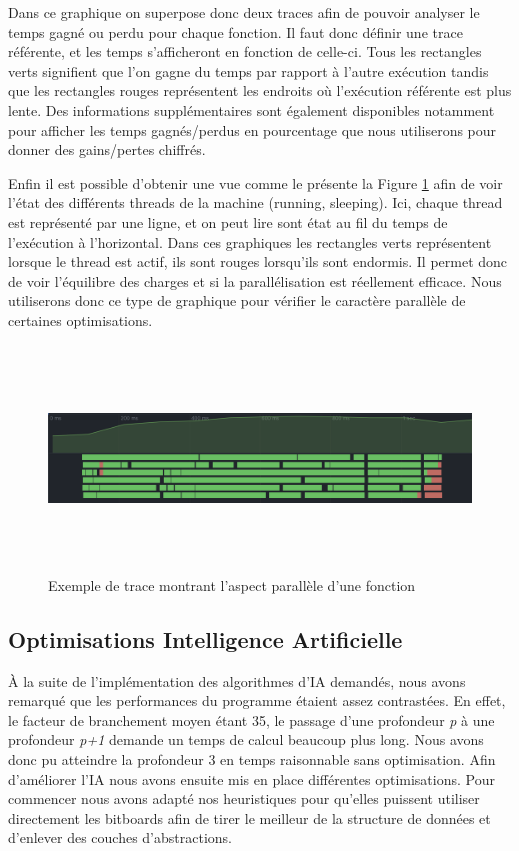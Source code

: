\documentclass{article}
\begin{document}
Dans ce graphique on superpose donc deux traces afin de pouvoir analyser le temps gagné ou perdu pour chaque fonction. Il faut donc définir une trace référente, et les temps
s'afficheront en fonction de celle-ci. Tous les rectangles verts signifient que l'on gagne du temps par rapport à l'autre exécution tandis que les rectangles rouges représentent
les endroits où l'exécution référente est plus lente. Des informations supplémentaires sont également disponibles notamment pour afficher les temps gagnés/perdus en pourcentage
que nous utiliserons pour donner des gains/pertes chiffrés.

Enfin il est possible d'obtenir une vue comme le présente la Figure \ref{thread_ex} afin de voir l'état des différents threads de la machine (running, sleeping). Ici, chaque thread est représenté
par une ligne, et on peut lire sont état au fil du temps de l'exécution à l'horizontal. Dans ces graphiques les rectangles verts
représentent lorsque le thread est actif, ils sont rouges lorsqu'ils sont endormis. Il permet donc de voir l'équilibre des charges et si la parallélisation est réellement efficace.
Nous utiliserons donc ce type de graphique pour vérifier le caractère parallèle de certaines optimisations.

\begin{figure}[h]
    \centering
    \includegraphics[width=\textwidth,height=6.0cm,keepaspectratio]{threads_ex.png}
    \caption{Exemple de trace montrant l'aspect parallèle d'une fonction}
    \label{thread_ex}
\end{figure}
\FloatBarrier

\subsection{Optimisations Intelligence Artificielle}
À la suite de l'implémentation des algorithmes d'IA demandés, nous avons remarqué que les performances du programme étaient assez contrastées. En effet, le facteur
de branchement moyen étant 35, le passage d'une profondeur \textit{p} à une profondeur \textit{p+1} demande un temps de calcul beaucoup plus long. Nous avons donc pu atteindre la profondeur 3
en temps raisonnable sans optimisation. Afin d'améliorer l'IA nous avons ensuite mis en place différentes optimisations. Pour commencer nous avons adapté nos heuristiques
pour qu'elles puissent utiliser directement les bitboards afin de tirer le meilleur de la structure de données et d'enlever des couches d'abstractions.
\end{document}
